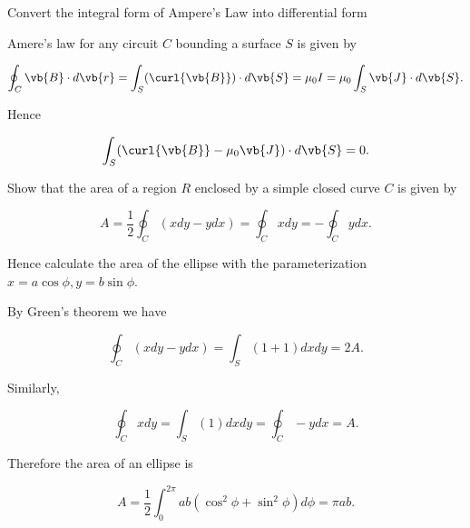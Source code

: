 \documentclass[english,a4paper,12pt]{report}
\begin{document}
{Convert the integral form of Ampere's Law into differential form}
{Amere's law for any circuit \(C\) bounding a surface \(S\) is given by 

\begin{equation}
	\oint_{C} \vb{B} \cdot d\vb{r} = \int_{S}^{} (\curl{\vb{B} } ) \cdot d\vb{S} =  \mu _{0} I = \mu _{0}  \int_{S}^{} \vb{J} \cdot d\vb{S} .  
\end{equation}

Hence 

\begin{equation}
	\int_{S}^{} (\curl{\vb{B} } - \mu _{0} \vb{J}  ) \cdot d\vb{S} = 0.
\end{equation}
}

{Show that the area of a region \(R\) enclosed by a simple closed curve \(C\) is given by 

\begin{equation}
	A = \frac{1}{2} \oint_{C}(xdy - ydx) = \oint_{C}xdy = - \oint_{C}y dx.
\end{equation}

Hence calculate the area of the ellipse with the parameterization \(x = a \cos \phi , y = b\sin \phi \). }
{By Green's theorem we have 

\begin{equation} \label{area} 
	\oint_{C} (xdy- ydx) = \int_{S}^{}  (1+1) dxdy = 2A.  
\end{equation}

Similarly, 

\begin{equation}
	\oint_{C} xdy = \int_{S}^{} (1) dxdy = \oint_{C} -ydx = A. 
\end{equation}

Therefore the area of an ellipse is 

\begin{equation}
	A = \frac{1}{2} \int_{0}^{2\pi } ab(\cos ^2\phi + \sin ^2\phi ) d\phi  = \pi ab.   
\end{equation}
} 
\end{document}
